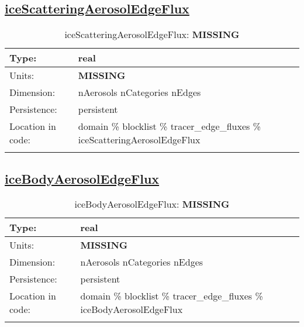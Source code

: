 \subsection[iceScatteringAerosolEdgeFlux]{\hyperref[sec:var_tab_tracer_edge_fluxes]{iceScatteringAerosolEdgeFlux}}
\label{subsec:var_sec_tracer_edge_fluxes_iceScatteringAerosolEdgeFlux}
\begin{center}
\begin{longtable}{| p{2.0in} | p{4.0in} |}
        \hline 
        Type: & real \\
        \hline 
        Units: & {\bf \color{red} MISSING} \\
        \hline 
        Dimension: & nAerosols nCategories nEdges \\
        \hline 
        Persistence: & persistent \\
        \hline 
         Location in code: & domain \% blocklist \% tracer\_edge\_fluxes \% iceScatteringAerosolEdgeFlux \\
         \hline 
    \caption{iceScatteringAerosolEdgeFlux: {\bf \color{red} MISSING}}
\end{longtable}
\end{center}
\subsection[iceBodyAerosolEdgeFlux]{\hyperref[sec:var_tab_tracer_edge_fluxes]{iceBodyAerosolEdgeFlux}}
\label{subsec:var_sec_tracer_edge_fluxes_iceBodyAerosolEdgeFlux}
\begin{center}
\begin{longtable}{| p{2.0in} | p{4.0in} |}
        \hline 
        Type: & real \\
        \hline 
        Units: & {\bf \color{red} MISSING} \\
        \hline 
        Dimension: & nAerosols nCategories nEdges \\
        \hline 
        Persistence: & persistent \\
        \hline 
         Location in code: & domain \% blocklist \% tracer\_edge\_fluxes \% iceBodyAerosolEdgeFlux \\
         \hline 
    \caption{iceBodyAerosolEdgeFlux: {\bf \color{red} MISSING}}
\end{longtable}
\end{center}
